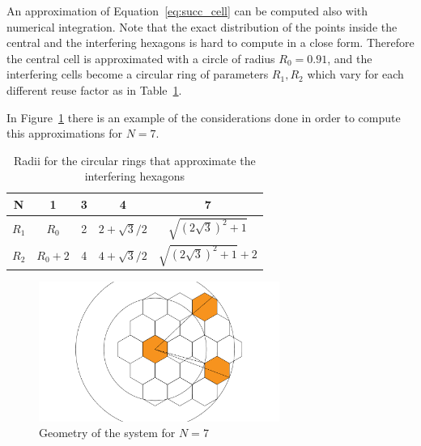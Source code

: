 \documentclass[10pt]{article}
\begin{document}
An approximation of Equation~\eqref{eq:succ_cell} can be computed also with numerical integration. Note that the exact distribution of the points inside the central and the interfering hexagons is hard to compute in a close form. Therefore the central cell is approximated with a circle of radius $R_0 = 0.91$, and the interfering cells become a circular ring of parameters $R_1, R_2$ which vary for each different reuse factor as in Table~\ref{table:radii}.



In Figure~\ref{fig:hexa_cell} there is an example of the considerations done in order to compute this approximations for $N = 7$.
\clearpage

\begin{table}[h!]
\centering
\begin{tabular}{c|c|c|c|c}
N & 1 & 3 & 4 & 7 \\ \hline
$R_1$ & $R_0$ & 2 & $2 + \sqrt{3}/2$ & $ \sqrt{(2\sqrt{3})^2 + 1}$ \\
$R_2$ & $R_0 + 2$ & 4 & $4 + \sqrt{3}/2$ & $\sqrt{(2\sqrt{3})^2 + 1} + 2$
\end{tabular}
\caption{Radii for the circular rings that approximate the interfering hexagons}
\label{table:radii}
\end{table}

\begin{figure}[h!]
  \centering
  \includegraphics[width = 0.7\textwidth]{hexa}
  \caption{Geometry of the system for $N = 7$}
  \label{fig:hexa_cell}
\end{figure}
\end{document}
